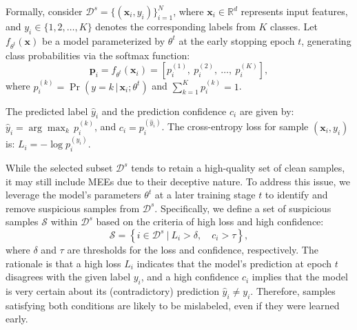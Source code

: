 Formally, consider \( \mathcal{D}^s = \{(\mathbf{x}_i, y_i) \}_{i=1}^N \), where \( \mathbf{x}_i \in \mathbb{R}^d \) represents input features, and \( y_i \in \{1, 2, \dots, K \} \) denotes the corresponding labels from \( K \) classes. Let \( f_{\theta^t}(\mathbf{x}) \) be a model parameterized by \( \theta^t \) at the early stopping epoch \( t \), generating class probabilities via the softmax function:
\begin{equation}
\mathbf{p}_i = f_{\theta^t}(\mathbf{x}_i) = \left[ p_i^{(1)},\ p_i^{(2)},\ \dots,\ p_i^{(K)} \right],
\end{equation}
where \( p_i^{(k)} = \Pr(y = k \,\vert\, \mathbf{x}_i; \theta^t) \) and \( \sum_{k=1}^{K} p_i^{(k)} = 1 \).

The predicted label \( \hat{y}_i \) and the prediction confidence \( c_i \) are given by: \( \hat{y}_i = \arg\max_{k} \, p_i^{(k)} \), and \( c_i = p_i^{(\hat{y}_i)} \).
The cross-entropy loss for sample \( (\mathbf{x}_i, y_i) \) is: \( L_i = -\log p_i^{(y_i)} \).


While the selected subset \( \mathcal{D}^s \) tends to retain a high-quality set of clean samples, it may still include MEEs due to their deceptive nature. To address this issue, we leverage the model's parameters \( \theta^t \) at a later training stage \( t \) to identify and remove suspicious samples from \( \mathcal{D}^s \). Specifically, we define a set of suspicious samples \( \mathcal{S} \) within \( \mathcal{D}^s \) based on the criteria of high loss and high confidence:
\begin{equation}
\mathcal{S} = \left\{ i \in \mathcal{D}^s \ \big| \ L_i > \delta,\quad c_i > \tau \right\},
\end{equation}
where \( \delta \) and \( \tau \) are thresholds for the loss and confidence, respectively. The rationale is that a high loss \( L_i \) indicates that the model's prediction at epoch \( t \) disagrees with the given label \( y_i \), and a high confidence \( c_i \) implies that the model is very certain about its (contradictory) prediction \( \hat{y}_i \ne y_i \). Therefore, samples satisfying both conditions are likely to be mislabeled, even if they were learned early.

